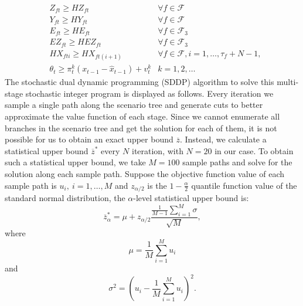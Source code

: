 \documentclass[12pt]{article}
\begin{document}
\begin{subequations}
\begin{align}
			& Z_{ft} \geq HZ_{ft} & \forall f \in \mathcal{F} \label{cons:transZtlr}\\
			& Y_{ft} \geq HY_{ft} & \forall f \in \mathcal{F} \label{cons:transYtlr}\\
			& E_{ft} \geq HE_{ft} & \forall f \in \mathcal{F}_3 \label{cons:transEtlr}\\
			& EZ_{ft} \geq HEZ_{ft} & \forall f \in \mathcal{F}_3 \label{cons:transEZtlr}\\
			& HX_{fti} \geq HX_{ft(i+1)} & \forall f \in \mathcal{F}, i = 1, \dots, \tau_{f} + N -1, \label{cons:transHXtlr}\\
			& \theta_t \geq \pi_t^k(x_{t-1} - \hat{x}_{t-1}) + v_t^k & k = 1, 2, \dots \label{cons:cutslr}
		\end{align}
	\end{subequations}
	\newline
	The stochastic dual dynamic programming (SDDP) algorithm to solve this multi-stage stochastic integer program is displayed as follows. Every iteration we sample a single path along the scenario tree and generate cuts to better approximate the value function of each stage. Since we cannot enumerate all branches in the scenario tree and get the solution for each of them, it is not possible for us to obtain an exact upper bound \(\overline{z}\). Instead, we calculate a statistical upper bound \(\overline{z}^*\) every \(N\) iteration, with \(N = 20\) in our case. To obtain such a statistical upper bound, we take \(M = 100\) sample paths and solve for the solution along each sample path. Suppose the objective function value of each sample path is \(u_i,\ i = 1, \dots, M\) and \(z_{\alpha/2}\) is the \(1 - \frac{\alpha}{2}\) quantile function value of the standard normal distribution, the \(\alpha\)-level statistical upper bound is:
	\begin{equation}
		\overline{z}^*_\alpha = \mu + z_{\alpha/2} \frac{\frac{1}{M-1}\sum_{i = 1}^{M} \sigma}{\sqrt{M}},
	\end{equation}
	where 
	\[\mu = \frac{1}{M}\sum_{i = 1}^{M} u_i \]
	and
	\[\sigma^2 = (u_i - \frac{1}{M}\sum_{i = 1}^{M} u_i)^2.\]
\end{document}
